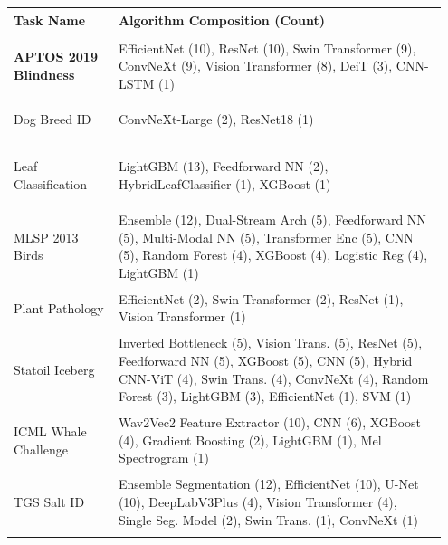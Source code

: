 

\begin{table}[t!]
    \centering
    \footnotesize
    
    \begin{tabular}{
        >{\raggedright\arraybackslash\bfseries}p{0.23\linewidth} 
        >{\raggedright\arraybackslash}p{0.72\linewidth}
    }
    \toprule
    Task Name & Algorithm Composition (Count) \\
    \midrule

    \multicolumn{2}{l}{\cellcolor{gray!15}\textbf{\textit{Computer Vision Domain}}} \\
    \midrule
    APTOS 2019 Blindness & EfficientNet (10), ResNet (10), Swin Transformer (9), ConvNeXt (9), Vision Transformer (8), DeiT (3), CNN-LSTM (1) \\ \addlinespace
    
    Dog Breed ID & ConvNeXt-Large (2), ResNet18 (1) \\ \addlinespace
    
    Leaf Classification & LightGBM (13), Feedforward NN (2), HybridLeafClassifier (1), XGBoost (1) \\ \addlinespace
    
    MLSP 2013 Birds & Ensemble (12), Dual-Stream Arch (5), Feedforward NN (5), Multi-Modal NN (5), Transformer Enc (5), CNN (5), Random Forest (4), XGBoost (4), Logistic Reg (4), LightGBM (1) \\ \addlinespace
    
    Plant Pathology & EfficientNet (2), Swin Transformer (2), ResNet (1), Vision Transformer (1) \\ \addlinespace
    
    Statoil Iceberg & Inverted Bottleneck (5), Vision Trans. (5), ResNet (5), Feedforward NN (5), XGBoost (5), CNN (5), Hybrid CNN-ViT (4), Swin Trans. (4), ConvNeXt (4), Random Forest (3), LightGBM (3), EfficientNet (1), SVM (1) \\ \addlinespace
    
    ICML Whale Challenge & Wav2Vec2 Feature Extractor (10), CNN (6), XGBoost (4), Gradient Boosting (2), LightGBM (1), Mel Spectrogram (1) \\ \addlinespace
    
    TGS Salt ID & Ensemble Segmentation (12), EfficientNet (10), U-Net (10), DeepLabV3Plus (4), Vision Transformer (4), Single Seg. Model (2), Swin Trans. (1), ConvNeXt (1) \\ \addlinespace
    

\end{tabular}
\end{table}
